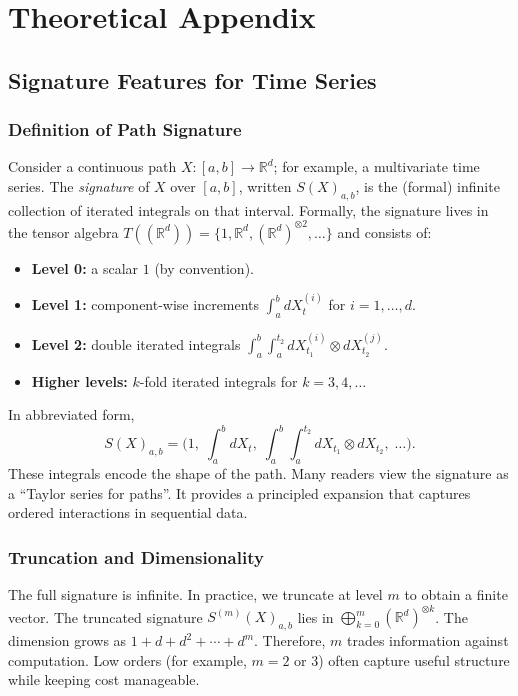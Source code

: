 \chapter{Theoretical Appendix}

\section{Signature Features for Time Series}

\subsection{Definition of Path Signature}
Consider a continuous path $X: [a,b] \to \mathbb{R}^d$; for example, a multivariate time series. The \emph{signature} of $X$ over $[a,b]$, written $S(X)_{a,b}$, is the (formal) infinite collection of iterated integrals on that interval. Formally, the signature lives in the tensor algebra $T((\mathbb{R}^d)) = \{1, \mathbb{R}^d, (\mathbb{R}^d)^{\otimes 2}, \dots\}$ and consists of:
\begin{itemize}
    \item \textbf{Level 0:} a scalar $1$ (by convention).
    \item \textbf{Level 1:} component-wise increments $\int_a^b dX_t^{(i)}$ for $i=1,\dots,d$.
    \item \textbf{Level 2:} double iterated integrals $\int_a^b \int_a^{t_2} dX_{t_1}^{(i)} \otimes dX_{t_2}^{(j)}$.
    \item \textbf{Higher levels:} $k$-fold iterated integrals for $k=3,4,\dots$
\end{itemize}
In abbreviated form,
\[
S(X)_{a,b} = \Big(1,\;\int_a^b dX_t,\;\int_a^b\!\int_a^{t_2} dX_{t_1}\otimes dX_{t_2},\;\dots\Big).
\]
These integrals encode the shape of the path. Many readers view the signature as a “Taylor series for paths”. It provides a principled expansion that captures ordered interactions in sequential data.

\subsection{Truncation and Dimensionality}
The full signature is infinite. In practice, we truncate at level $m$ to obtain a finite vector. The truncated signature $S^{(m)}(X)_{a,b}$ lies in $\bigoplus_{k=0}^m (\mathbb{R}^d)^{\otimes k}$. The dimension grows as $1 + d + d^2 + \cdots + d^m$. Therefore, $m$ trades information against computation. Low orders (for example, $m=2$ or $3$) often capture useful structure while keeping cost manageable.

